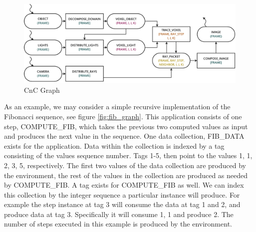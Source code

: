 \begin{figure}[!htb]
  \centering
  \includegraphics[width=\textwidth]{drawings/CnC.pdf}
  \caption{CnC Graph}
  \label{fig:cnc}
\end{figure}

As an example, we may consider a simple recursive implementation of the Fibonacci sequence, see figure \ref{fig:fib_graph}.  This application consists of one step, COMPUTE\_FIB, which takes the previous two computed values as input and produces the next value in the sequence.  One data collection, FIB\_DATA exists for the application.  Data within the collection is indexed by a tag consisting of the values sequence number. Tags 1-5, then point to the values 1, 1, 2, 3, 5, respectively.  The first two values of the data collection are produced by the environment, the rest of the values in the collection are produced as needed by COMPUTE\_FIB.  A tag exists for COMPUTE\_FIB as well.  We can index this collection by the integer sequence a particular instance will produce.  For example the step instance at tag 3 will consume the data at tag 1 and 2, and produce data at tag 3.  Specifically it will consume 1, 1 and produce 2.  The number of steps executed in this example is produced by the environment.

